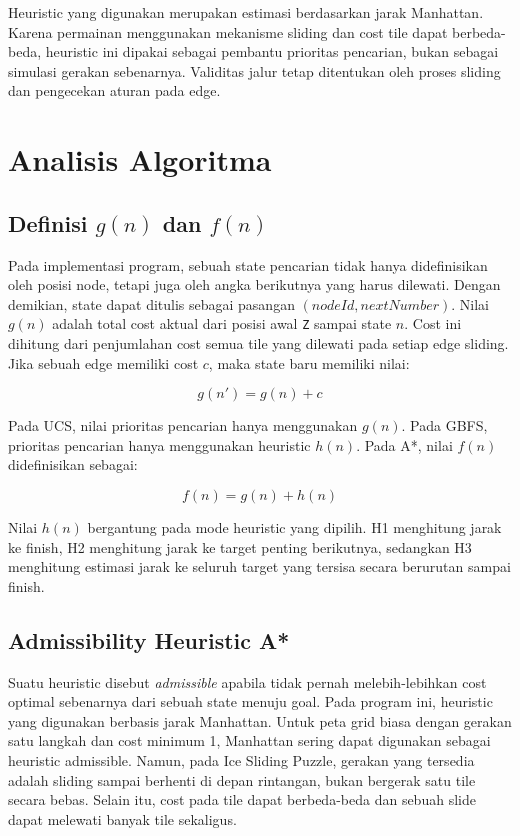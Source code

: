 \documentclass[a4paper,11pt]{article}
\begin{document}
Heuristic yang digunakan merupakan estimasi berdasarkan jarak Manhattan. Karena permainan menggunakan mekanisme sliding dan cost tile dapat berbeda-beda, heuristic ini dipakai sebagai pembantu prioritas pencarian, bukan sebagai simulasi gerakan sebenarnya. Validitas jalur tetap ditentukan oleh proses sliding dan pengecekan aturan pada edge.

\section{Analisis Algoritma}
\subsection{Definisi \texorpdfstring{$g(n)$}{g(n)} dan \texorpdfstring{$f(n)$}{f(n)}}
Pada implementasi program, sebuah state pencarian tidak hanya didefinisikan oleh posisi node, tetapi juga oleh angka berikutnya yang harus dilewati. Dengan demikian, state dapat ditulis sebagai pasangan $(nodeId, nextNumber)$. Nilai \textbf{$g(n)$} adalah total cost aktual dari posisi awal \texttt{Z} sampai state $n$. Cost ini dihitung dari penjumlahan cost semua tile yang dilewati pada setiap edge sliding. Jika sebuah edge memiliki cost $c$, maka state baru memiliki nilai:

\[
g(n') = g(n) + c
\]

Pada UCS, nilai prioritas pencarian hanya menggunakan $g(n)$. Pada GBFS, prioritas pencarian hanya menggunakan heuristic $h(n)$. Pada A*, nilai \textbf{$f(n)$} didefinisikan sebagai:

\[
f(n) = g(n) + h(n)
\]

Nilai $h(n)$ bergantung pada mode heuristic yang dipilih. H1 menghitung jarak ke finish, H2 menghitung jarak ke target penting berikutnya, sedangkan H3 menghitung estimasi jarak ke seluruh target yang tersisa secara berurutan sampai finish.

\subsection{Admissibility Heuristic A*}
Suatu heuristic disebut \textit{admissible} apabila tidak pernah melebih-lebihkan cost optimal sebenarnya dari sebuah state menuju goal. Pada program ini, heuristic yang digunakan berbasis jarak Manhattan. Untuk peta grid biasa dengan gerakan satu langkah dan cost minimum 1, Manhattan sering dapat digunakan sebagai heuristic admissible. Namun, pada Ice Sliding Puzzle, gerakan yang tersedia adalah sliding sampai berhenti di depan rintangan, bukan bergerak satu tile secara bebas. Selain itu, cost pada tile dapat berbeda-beda dan sebuah slide dapat melewati banyak tile sekaligus.
\end{document}
